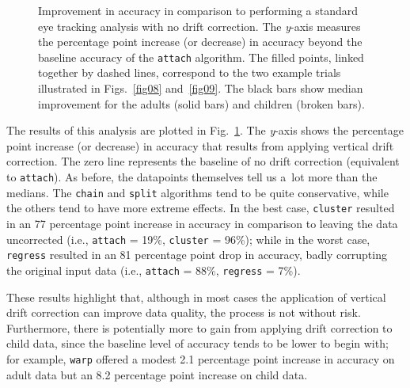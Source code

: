 \documentclass[doc,biblatex]{apa7}
\begin{document}
	\begin{figure}
	\vspace*{2pt}
	\caption{Improvement in accuracy in comparison to performing a standard eye tracking analysis with no drift correction. The \textit{y}-axis measures the percentage point increase (or decrease) in accuracy beyond the baseline accuracy of the \texttt{attach} algorithm. The filled points, linked together by dashed lines, correspond to the two example trials illustrated in Figs.~\ref{fig08} and~\ref{fig09}. The black bars show median improvement for the adults (solid bars) and children (broken bars).}
	\label{fig11}
	\end{figure}

The results of this analysis are plotted in Fig.~\ref{fig11}. The \textit{y}-axis shows the percentage point increase (or decrease) in accuracy that results from applying vertical drift correction. The zero line represents the baseline of no drift correction (equivalent to \texttt{attach}). As before, the datapoints themselves tell us a~lot more than the medians. The \texttt{chain} and \texttt{split} algorithms tend to be quite conservative, while the others tend to have more extreme effects. In the best case, \texttt{cluster} resulted in an 77 percentage point increase in accuracy in comparison to leaving the data uncorrected (i.e., \texttt{attach} = 19\%, \texttt{cluster} = 96\%); while in the worst case, \texttt{regress} resulted in an 81 percentage point drop in accuracy, badly corrupting the original input data (i.e., \texttt{attach} = 88\%, \texttt{regress} = 7\%).

These results highlight that, although in most cases the application of vertical drift correction can improve data quality, the process is not without risk. Furthermore, there is potentially more to gain from applying drift correction to child data, since the baseline level of accuracy tends to be lower to begin with; for example, \texttt{warp} offered a modest 2.1 percentage point increase in accuracy on adult data but an 8.2 percentage point increase on child data.
\end{document}

